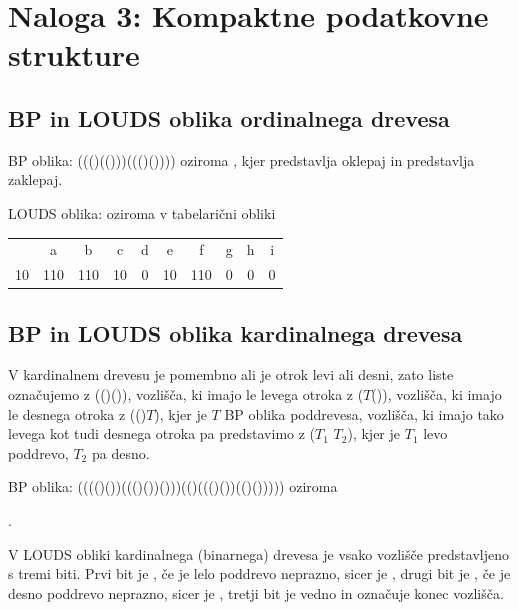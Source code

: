 \documentclass{article}
\begin{document}
\pagebreak

\section*{Naloga 3: Kompaktne podatkovne strukture}

\subsection*{BP in LOUDS oblika ordinalnega drevesa}
BP oblika: ((()(()))((()()))) oziroma {}, kjer {} predstavlja oklepaj in {} predstavlja zaklepaj.

\noindent
LOUDS oblika: {} oziroma v tabelarični obliki
\begin{table}[htbp]
    \centering
    \begin{tabular}{|c|c|c|c|c|c|c|c|c|c|}
        \hline
        & a & b & c & d & e & f & g & h & i \\
        10 & 110 & 110 & 10 & 0 & 10 & 110 & 0 & 0 & 0 \\
        \hline
    \end{tabular}
\end{table}

\subsection*{BP in LOUDS oblika kardinalnega drevesa}

V kardinalnem drevesu je pomembno ali je otrok levi ali desni, zato liste označujemo z (()()), vozlišča, ki imajo le levega otroka z ($T$()), vozlišča, ki imajo le desnega otroka z (()$T$), kjer je $T$ BP oblika poddrevesa, vozlišča, ki imajo tako levega kot tudi desnega otroka pa predstavimo z ($T_1$ $T_2$), kjer je $T_1$ levo poddrevo, $T_2$ pa desno.

\noindent
BP oblika: (((()())((()())()))(()((()())(()())))) oziroma

\quad {}.

\noindent
V LOUDS obliki kardinalnega (binarnega) drevesa je vsako vozlišče predstavljeno s tremi biti. Prvi bit je {}, če je lelo poddrevo neprazno, sicer je {}, drugi bit je {}, če je desno poddrevo neprazno, sicer je {}, tretji bit je vedno {} in označuje konec vozlišča.
\end{document}
